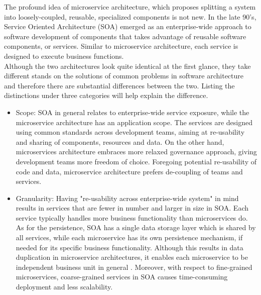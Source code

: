 \documentclass{Configuration_Files/PoliMi3i_thesis}
\begin{document}
The profound idea of microservice architecture, which proposes splitting a system into loosely-coupled, reusable, specialized components is not new.
In the late 90's, Service Oriented Architecture (SOA) emerged as an enterprise-wide approach to software development of components that takes advantage of reusable software components, or services.
Similar to microservice architecture, each service is designed to execute business functions.
\\
Although the two architectures look quite identical at the first glance, they take different stands on the solutions of common problems in software architecture and therefore there are substantial differences between the two.
Listing the distinctions under three categories will help explain the difference.

\begin{itemize}
    \item Scope: SOA in general relates to enterprise-wide service exposure, while the microservice architecture has an application scope.
    The services are designed using common standards across development teams, aiming at re-usability and sharing of components, resources and data. On the other hand, microservices architecture embraces more relaxed governance approach, giving development teams more freedom of choice.
    Foregoing potential re-usability of code and data, microservice architecture prefers de-coupling of teams and services.
    
    \item Granularity: Having "re-usability across enterprise-wide system" in mind results in services that are fewer in number and larger in size in SOA. Each service typically handles more business functionality than microservices do. As for the persistence, SOA has a single data storage layer which is shared by all services, while each microservice has its own persistence mechanism, if needed for its specific business functionality. Although this results in data duplication in microservice architectures, it enables each microservice to be independent business unit in general \cite{soa_granularity}.
    Moreover, with respect to fine-grained microservices, coarse-grained services in SOA causes time-consuming deployment and less scalability.
    

\end{itemize}
\end{document}
